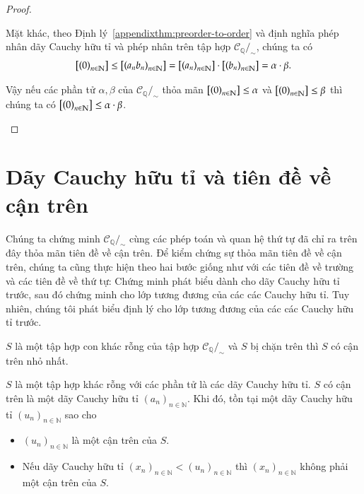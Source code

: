 \begin{proof}
\begin{enumerate}[label={(\roman*)}]
              Mặt khác, theo Định lý~\ref{appendixthm:preorder-to-order} và định nghĩa phép nhân dãy Cauchy hữu tỉ và phép nhân trên tập hợp $\mathscr{C}_{\mathbb{Q}}/_{\sim}$, chúng ta có
              \begin{align*}
                  \left[{\left({0}\right)}_{{n}\in\mathbb{N}}\right] \leq \left[{\left({a_{n}b_{n}}\right)}_{{n}\in\mathbb{N}}\right] = \left[{\left({a_{n}}\right)}_{{n}\in\mathbb{N}}\right]\cdot\left[{\left({b_{n}}\right)}_{{n}\in\mathbb{N}}\right] = \alpha\cdot\beta.
              \end{align*}

              Vậy nếu các phần tử $\alpha, \beta$ của $\mathscr{C}_{\mathbb{Q}}/_{\sim}$ thỏa mãn $\left[{\left({0}\right)}_{{n}\in\mathbb{N}}\right] \leq \alpha$ và $\left[{\left({0}\right)}_{{n}\in\mathbb{N}}\right]\leq \beta$ thì chúng ta có $\left[{\left({0}\right)}_{{n}\in\mathbb{N}}\right]\leq \alpha\cdot\beta$.
    \end{enumerate}
\end{proof}

\section{Dãy Cauchy hữu tỉ và tiên đề về cận trên}

Chúng ta chứng minh $\mathscr{C}_{\mathbb{Q}}/_{\sim}$ cùng các phép toán và quan hệ thứ tự đã chỉ ra trên đây thỏa mãn tiên đề về cận trên. Để kiểm chứng sự thỏa mãn tiên đề về cận trên, chúng ta cũng thực hiện theo hai bước giống như với các tiên đề về trường và các tiên đề về thứ tự: Chứng minh phát biểu dành cho dãy Cauchy hữu tỉ trước, sau đó chứng minh cho lớp tương đương của các các Cauchy hữu tỉ. Tuy nhiên, chúng tôi phát biểu định lý cho lớp tương đương của các các Cauchy hữu tỉ trước.

\begin{appendixthm}\label{appendixthm:equivalence-class-cauchy-sequence-and-the-axioms-of-completeness}
    $S$ là một tập hợp con khác rỗng của tập hợp $\mathscr{C}_{\mathbb{Q}}/_{\sim}$ và $S$ bị chặn trên thì $S$ có cận trên nhỏ nhất.
\end{appendixthm}

\begin{appendixthm}\label{appendixthm:cauchy-sequence-and-the-axioms-of-completeness}
    $S$ là một tập hợp khác rỗng với các phần tử là các dãy Cauchy hữu tỉ. $S$ có cận trên là một dãy Cauchy hữu tỉ ${(a_{n})}_{n\in\mathbb{N}}$. Khi đó, tồn tại một dãy Cauchy hữu tỉ ${(u_{n})}_{n\in\mathbb{N}}$ sao cho
    \begin{itemize}
        \item ${(u_{n})}_{n\in\mathbb{N}}$ là một cận trên của $S$.
        \item Nếu dãy Cauchy hữu tỉ ${(x_{n})}_{n\in\mathbb{N}} < {(u_{n})}_{n\in\mathbb{N}}$ thì ${(x_{n})}_{n\in\mathbb{N}}$ không phải một cận trên của $S$.
    \end{itemize}
\end{appendixthm}


